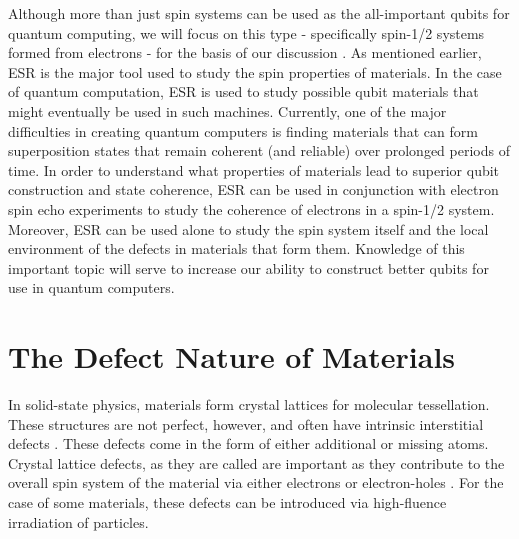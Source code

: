 \documentclass[oneside, noacknowlegments]{BYUPhys}
\begin{document}
Although more than just spin systems can be used as the all-important qubits for quantum computing, we will focus on this type - specifically spin-1/2 systems formed from electrons - for the basis of our discussion \cite{RefWorks:doc:58929612e4b0499fa95c50fa}. As mentioned earlier, ESR is the major tool used to study the spin properties of materials. In the case of quantum computation, ESR is used to study possible qubit materials that might eventually be used in such machines. Currently, one of the major difficulties in creating quantum computers is finding materials that can form superposition states that remain coherent (and reliable) over prolonged periods of time. In order to understand what properties of materials lead to superior qubit construction and state coherence, ESR can be used in conjunction with electron spin echo experiments to study the coherence of electrons in a spin-1/2 system. Moreover, ESR can be used alone to study the spin system itself and the local environment of the defects in materials that form them. Knowledge of this important topic will serve to increase our ability to construct better qubits for use in quantum computers.

\section{The Defect Nature of Materials}

In solid-state physics, materials form crystal lattices for molecular tessellation. These structures are not perfect, however, and often have intrinsic interstitial defects \cite{RefWorks:doc:58929264e4b0d4c09201f63b}. These defects come in the form of either additional or missing atoms. Crystal lattice defects, as they are called are important as they contribute to the overall spin system of the material via either electrons or electron-holes \cite{RefWorks:doc:58929816e4b0499fa95c51a6}. For the case of some materials, these defects can be introduced via high-fluence irradiation of particles.
\end{document}
